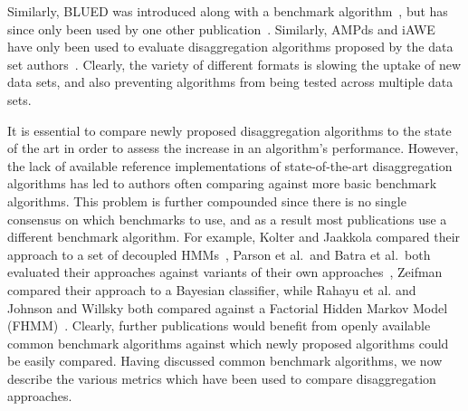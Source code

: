 \documentclass{sig-alternate}
\newcommand{\bluecolor}[1]{\textcolor{blue}{#1}}
\begin{document}
Similarly, BLUED was introduced along with a benchmark algorithm~\cite{blued}, but has since only been used by one other publication~\cite{anderson_2012}. Similarly, AMPds and iAWE have only been used to evaluate disaggregation algorithms proposed by the data set authors~\cite{ampds,iawe}. Clearly, the variety of different formats is slowing the uptake of new data sets, and also preventing algorithms from being tested across multiple data sets. 

It is essential to compare newly proposed disaggregation algorithms to the state of the art in order to assess the increase in an algorithm's performance. However, the lack of available reference implementations of state-of-the-art disaggregation algorithms has led to authors often comparing against more basic benchmark algorithms. This problem is further compounded since there is no single consensus on which benchmarks to use, and as a result most publications use a different benchmark algorithm. For example, Kolter and Jaakkola compared their approach to a set of decoupled HMMs~\cite{kolter_2012}, Parson et al.\ and Batra et al.\ both evaluated their approaches against variants of their own approaches~\cite{parson_2012,batra_2013}, Zeifman compared their approach to a Bayesian classifier, while Rahayu et al. and Johnson and Willsky both compared against a Factorial Hidden Markov Model (FHMM)~\cite{rahayu_2012,johnson_2013}. Clearly, further publications would benefit from openly available common benchmark algorithms against which newly proposed algorithms could be easily compared. Having discussed common benchmark algorithms, we now describe the various metrics which have been used to compare disaggregation approaches.

\end{document}
